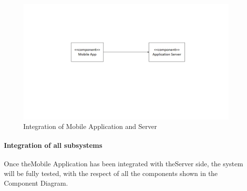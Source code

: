 \begin{figure}[H]
\centering
\includegraphics[width=\textwidth]{Images/MobileServerIntegration.png}
\caption{\label{fig:MobileServerIntegration} Integration of Mobile Application and Server }
\end{figure}

\paragraph{Integration of all subsystems}
Once theMobile Application has been integrated with theServer side, the system will be fully tested, with the respect of all the components shown in the Component Diagram.
